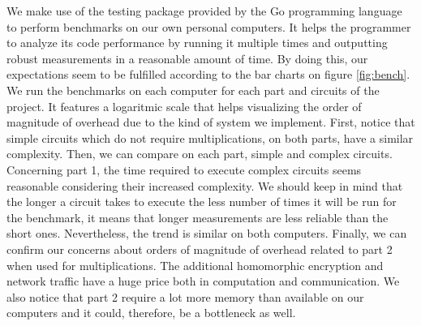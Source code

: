 \documentclass[10pt,conference]{IEEEtran}
\begin{document}
\begin{itemize}
We make use of the testing package provided by the Go programming language to perform benchmarks on our own personal computers. It helps the programmer to analyze its code performance by running it multiple times and outputting robust measurements in a reasonable amount of time. By doing this, our expectations seem to be fulfilled according to the bar charts on figure \ref{fig:bench}. We run the benchmarks on each computer for each part and circuits of the project. It features a logaritmic scale that helps visualizing the order of magnitude of overhead due to the kind of system we implement. First, notice that simple circuits which do not require multiplications, on both parts, have a similar complexity. Then, we can compare on each part, simple and complex circuits. Concerning part 1, the time required to execute complex circuits seems reasonable considering their increased complexity. We should keep in mind that the longer a circuit takes to execute the less number of times it will be run for the benchmark, it means that longer measurements are less reliable than the short ones. Nevertheless, the trend is similar on both computers. Finally, we can confirm our concerns about orders of magnitude of overhead related to part 2 when used for multiplications. The additional homomorphic encryption and network traffic have a huge price both in computation and communication. We also notice that part 2 require a lot more memory than available on our computers and it could, therefore, be a bottleneck as well.


\end{itemize}
\end{document}
